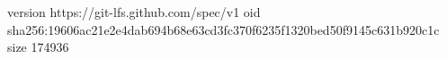 version https://git-lfs.github.com/spec/v1
oid sha256:19606ac21e2e4dab694b68e63cd3fc370f6235f1320bed50f9145c631b920c1c
size 174936
